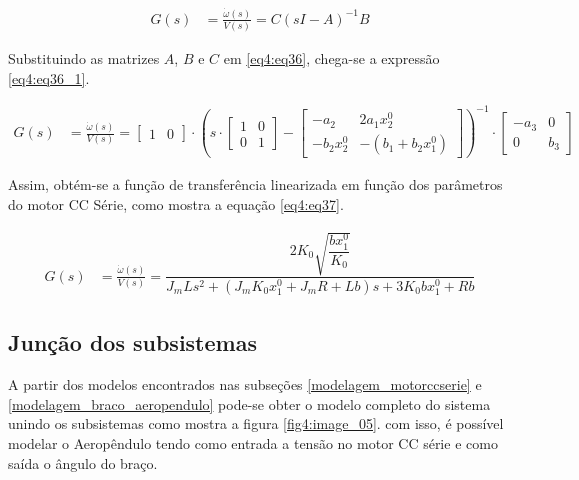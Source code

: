 \begin{align}
    G(s) &= \frac{\dot{\omega}(s)}{V(s)} = C(sI-A)^{-1}B     \label{eq4:eq36}
\end{align}

Substituindo as matrizes $A$, $B$ e $C$ em \ref{eq4:eq36}, chega-se a expressão \ref{eq4:eq36_1}.

\begin{align}
    G(s) &= \frac{\dot{\omega}(s)}{V(s)} = \begin{bmatrix}
        1 & 0
\end{bmatrix} \cdot \left(s \cdot \begin{bmatrix}
    1  & 0\\
    0  & 1
\end{bmatrix}-\begin{bmatrix}
    -a_2       &   2a_1x_2^0\\
    -b_2x_2^0  & -(b_1+b_2x_1^0)
\end{bmatrix}\right)^{-1} \cdot \begin{bmatrix}
    -a_3       &   0\\
    0  & b_3
\end{bmatrix}     \label{eq4:eq36_1}
\end{align}

Assim, obtém-se a função de transferência linearizada em função dos parâmetros do motor CC Série, como mostra a equação \ref{eq4:eq37}.



\begin{align}
    G(s) &= \frac{\dot{\omega}(s)}{V(s)} = \dfrac{2 K_{0} \sqrt{\dfrac{b x^{0}_{1}}{K_{0}}}}{J_m L s^{2} + \left(J_m K_{0} x^{0}_{1} + J_m R + L b\right)s  + 3 K_{0} b x^{0}_{1} + R b }     \label{eq4:eq37}
\end{align}

\vspace{1cm}



\subsection{Junção dos subsistemas}
\label{junca0_submodelos}

A partir dos modelos encontrados nas subseções \ref{modelagem_motorccserie} e \ref{modelagem_braco_aeropendulo} pode-se obter o modelo completo do sistema unindo os subsistemas como mostra a figura \ref{fig4:image_05}. com isso, é possível modelar o Aeropêndulo tendo como entrada a tensão no motor CC série e como saída o ângulo do braço.

